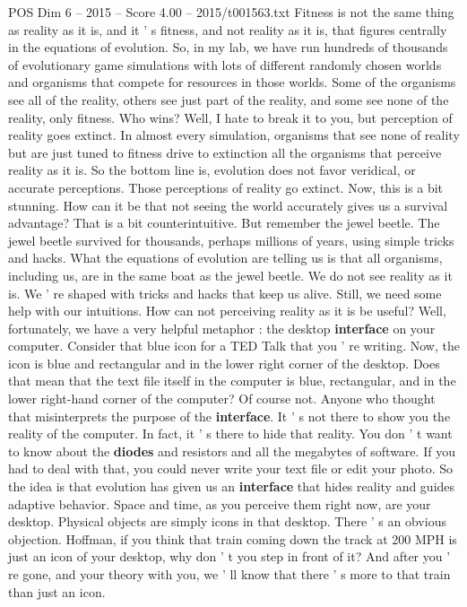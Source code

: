 \begin{textsample}{POS Dim 6 – 2015 – Score 4.00 – 2015/t001563.txt}
Fitness is not the same thing as reality as it is, and it ' s fitness, and not reality as it is, that figures centrally in the equations of evolution.
So, in my lab, we have run hundreds of thousands of evolutionary game simulations with lots of different randomly chosen worlds and organisms that compete for resources in those worlds.
Some of the organisms see all of the reality, others see just part of the reality, and some see none of the reality, only fitness.
Who wins?
Well, I hate to break it to you, but perception of reality goes extinct.
In almost every simulation, organisms that see none of reality but are just tuned to fitness drive to extinction all the organisms that perceive reality as it is.
So the bottom line is, evolution does not favor veridical, or accurate perceptions.
Those perceptions of reality go extinct.
Now, this is a bit stunning.
How can it be that not seeing the world accurately gives us a survival advantage?
That is a bit counterintuitive.
But remember the jewel beetle.
The jewel beetle survived for thousands, perhaps millions of years, using simple tricks and hacks.
What the equations of evolution are telling us is that all organisms, including us, are in the same boat as the jewel beetle.
We do not see reality as it is.
We ' re shaped with tricks and hacks that keep us alive.
Still, we need some help with our intuitions.
How can not perceiving reality as it is be useful?
Well, fortunately, we have a very helpful metaphor : the desktop \textbf{interface} on your computer.
Consider that blue icon for a TED Talk that you ' re writing.
Now, the icon is blue and rectangular and in the lower right corner of the desktop.
Does that mean that the text file itself in the computer is blue, rectangular, and in the lower right-hand corner of the computer?
Of course not.
Anyone who thought that misinterprets the purpose of the \textbf{interface}.
It ' s not there to show you the reality of the computer.
In fact, it ' s there to hide that reality.
You don ' t want to know about the \textbf{diodes} and resistors and all the megabytes of software.
If you had to deal with that, you could never write your text file or edit your photo.
So the idea is that evolution has given us an \textbf{interface} that hides reality and guides adaptive behavior.
Space and time, as you perceive them right now, are your desktop.
Physical objects are simply icons in that desktop.
There ' s an obvious objection.
Hoffman, if you think that train coming down the track at 200 MPH is just an icon of your desktop, why don ' t you step in front of it?
And after you ' re gone, and your theory with you, we ' ll know that there ' s more to that train than just an icon.

\end{textsample}
